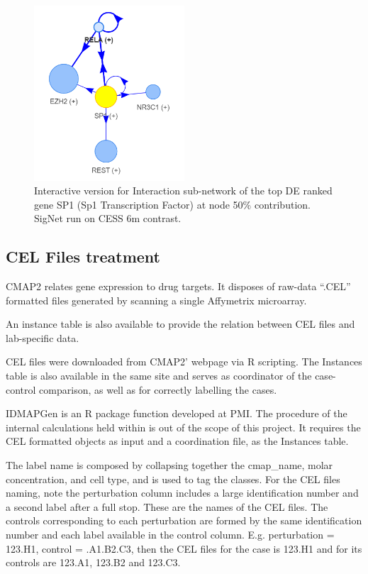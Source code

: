 \begin{figure}[!htbp]
    \centering
    \includegraphics[width=0.5\textwidth, height=\textheight, keepaspectratio]{Major Thesis/figures/iut/graph/iCESS6m50-SP1.png}
    \caption{Interactive version for Interaction sub-network of the top DE ranked gene SP1 (Sp1 Transcription Factor) at node 50\% contribution. SigNet run on CESS 6m contrast.}
    \label{section:suppl:results:cess-interactive}
\end{figure}

\subsection{CEL Files treatment}
CMAP2 \cite{Subramanian2017AProfiles} relates gene expression to drug targets. It disposes of raw-data “.CEL” formatted files generated by scanning a single Affymetrix microarray.

An instance table is also available to provide the relation between CEL files and lab-specific data.

CEL files were downloaded from CMAP2’ webpage via R scripting. The Instances table is also available in the same site and serves as coordinator of the case-control comparison, as well as for correctly labelling the cases.

IDMAPGen is an R package function developed at PMI. The procedure of the internal calculations held within is out of the scope of this project. It requires the CEL formatted objects as input and a coordination file, as the Instances table.

The label name is composed by collapsing together the cmap\_name, molar concentration, and cell type, and is used to tag the classes. For the CEL files naming, note the perturbation column includes a large identification number and a second label after a full stop. These are the names of the CEL files. The controls corresponding to each perturbation are formed by the same identification number and each label available in the control column. E.g. perturbation = 123.H1, control = .A1.B2.C3, then the CEL files for the case is 123.H1 and for its controls are 123.A1, 123.B2 and 123.C3. 

